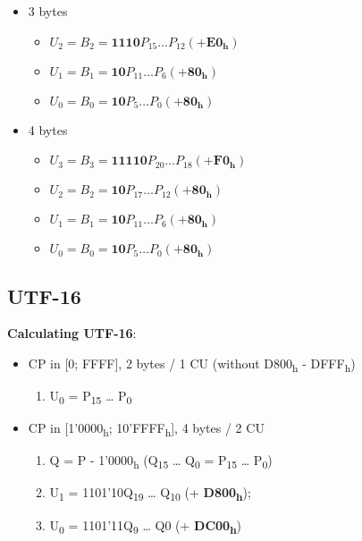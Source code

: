 \documentclass[11pt,twoside,landscape]{article}
\begin{document}
\begin{multicols}{3}
\begin{itemize}
\item 3 bytes
\begin{itemize}
\item \(U_2 = B_2 = \mathbf{1110}P_15 \dots P_12 (+\mathbf{E0_h})\)
\item \(U_1 = B_1 = \mathbf{10}P_11 \dots P_6 (+\mathbf{80_h})\)
\item \(U_0 = B_0 = \mathbf{10}P_5 \dots P_0 (+\mathbf{80_h})\)
\end{itemize}

\item 4 bytes
\begin{itemize}
\item \(U_3 = B_3 = \mathbf{11110}P_20 \dots P_18 (+\mathbf{F0_h})\)
\item \(U_2 = B_2 = \mathbf{10}P_17 \dots P_12 (+\mathbf{80_h})\)
\item \(U_1 = B_1 = \mathbf{10}P_11 \dots P_6 (+\mathbf{80_h})\)
\item \(U_0 = B_0 = \mathbf{10}P_5 \dots P_0 (+\mathbf{80_h})\)
\end{itemize}
\end{itemize}

\subsection*{UTF-16}
\label{sec:orgb451ab3}
\textbf{Calculating UTF-16}:
\begin{itemize}
\item CP in [0; FFFF], 2 bytes / 1 CU (without D800\textsubscript{h} - DFFF\textsubscript{h})
\begin{enumerate}
\item U\textsubscript{0} = P\textsubscript{15} \ldots{} P\textsubscript{0}
\end{enumerate}

\item CP in [1'0000\textsubscript{h}; 10'FFFF\textsubscript{h}], 4 bytes / 2 CU
\begin{enumerate}
\item Q = P - 1'0000\textsubscript{h} (Q\textsubscript{15} \ldots{} Q\textsubscript{0} = P\textsubscript{15} \ldots{} P\textsubscript{0})
\item U\textsubscript{1} = 1101'10Q\textsubscript{19} \ldots{} Q\textsubscript{10} (+ \textbf{D800\textsubscript{h}});
\item U\textsubscript{0} = 1101'11Q\textsubscript{9} \ldots{} Q0 (+ \textbf{DC00\textsubscript{h}})
\end{enumerate}
\end{itemize}


\end{multicols}
\end{document}
